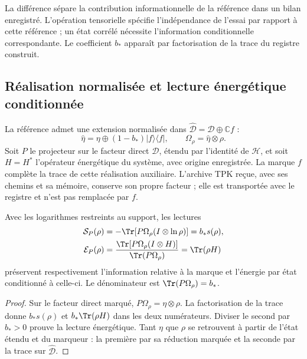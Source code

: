 La différence sépare la contribution informationnelle de la référence dans
un bilan enregistré. L’opération tensorielle spécifie l’indépendance
de l’essai par rapport à cette référence ; un état corrélé nécessite
l’information conditionnelle correspondante. Le coefficient $b_*$ apparaît
par factorisation de la trace du registre construit.

\subsection{Réalisation normalisée et lecture énergétique conditionnée}
\label{subsec:ii-ter27-flag}

La référence admet une extension normalisée dans
$\widehat{\mathcal D}=\mathcal D\oplus\mathbb C f$ :
\begin{equation}
 \widehat\eta=\eta\oplus(1-b_*)|f\rangle\langle f|,
 \qquad \Omega_\rho=\widehat\eta\otimes\rho.
 \label{eq:ii-ter27-flag}
\end{equation}
Soit $P$ le projecteur sur le facteur direct $\mathcal D$, étendu par l’identité
de $\mathcal H$, et soit $H=H^*$ l’opérateur énergétique du système,
avec origine enregistrée. La marque $f$ complète la trace de cette réalisation
auxiliaire. L’archive TPK reçue, avec ses chemins et sa mémoire, conserve son
propre facteur ; elle est transportée avec le registre et n’est pas remplacée par $f$.

\begin{proposition}
\label{prop:ii-ter27-readers}
Avec les logarithmes restreints au support, les lectures
\begin{align}
 \mathcal S_P(\rho)&=-\Tr[P\Omega_\rho(I\otimes\ln\rho)]
                    =b_*s(\rho),\label{eq:ii-ter27-S}\\
 \mathcal E_P(\rho)&=
 \frac{\Tr[P\Omega_\rho(I\otimes H)]}{\Tr(P\Omega_\rho)}
                    =\Tr(\rho H)\label{eq:ii-ter27-E}
\end{align}
préservent respectivement l’information relative à la marque et l’énergie
par état conditionné à celle-ci. Le dénominateur est $\Tr(P\Omega_\rho)=b_*$.
\end{proposition}
\begin{proof}
Sur le facteur direct marqué, $P\Omega_\rho=\eta\otimes\rho$.
La factorisation de la trace donne $b_*s(\rho)$ et
$b_*\Tr(\rho H)$ dans les deux numérateurs. Diviser le second par
$b_*>0$ prouve la lecture énergétique. Tant $\eta$ que $\rho$ se
retrouvent à partir de l’état étendu et du marqueur : la première par sa réduction
marquée et la seconde par la trace sur $\widehat{\mathcal D}$.
\end{proof}


